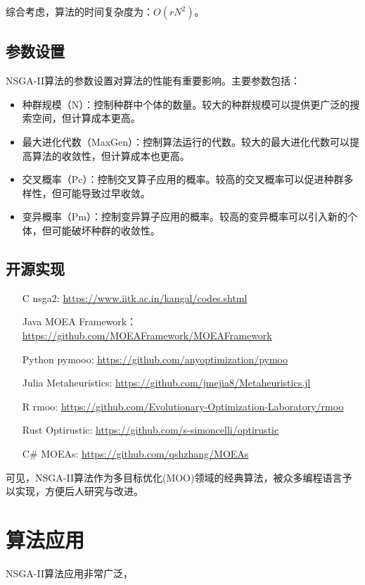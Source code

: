 \documentclass[lang=cn,a4paper,citestyle=gb7714-2015, bibstyle=gb7714-2015]{elegantpaper}
\newcommand{\link}[1]{\href{#1}{#1}}
\begin{document}
    综合考虑，算法的时间复杂度为：$O(rN^2)$。

    \subsection{参数设置}
    NSGA-II算法的参数设置对算法的性能有重要影响。主要参数包括：
    \begin{itemize}
        \item 种群规模（N）：控制种群中个体的数量。较大的种群规模可以提供更广泛的搜索空间，但计算成本更高。
        \item 最大进化代数（MaxGen）：控制算法运行的代数。较大的最大进化代数可以提高算法的收敛性，但计算成本也更高。
        \item 交叉概率（Pc）：控制交叉算子应用的概率。较高的交叉概率可以促进种群多样性，但可能导致过早收敛。
        \item 变异概率（Pm）：控制变异算子应用的概率。较高的变异概率可以引入新的个体，但可能破坏种群的收敛性。
    \end{itemize}
    \subsection{开源实现}

    \begin{enumerate}
        \item[C]nsga2: \link{https://www.iitk.ac.in/kangal/codes.shtml}
        \item[Java]MOEA Framework：\link{https://github.com/MOEAFramework/MOEAFramework}
        \item[Python]pymooo: \link{https://github.com/anyoptimization/pymoo}
        \item[Julia]Metaheuristics: \link{https://github.com/jmejia8/Metaheuristics.jl}
        \item[R]rmoo: \link{https://github.com/Evolutionary-Optimization-Laboratory/rmoo}
        \item[Rust]Optirustic: \link{https://github.com/s-simoncelli/optirustic}
        \item[C\#]MOEAs: \link{https://github.com/qshzhang/MOEAs}
    \end{enumerate}

    可见，NSGA-II算法作为多目标优化(MOO)领域的经典算法，被众多编程语言予以实现，方便后人研究与改进。
    \section{算法应用}
    NSGA-II算法应用非常广泛，
\end{document}
